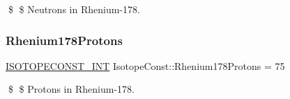 \$ \$ Neutrons in Rhenium-\/178. \mbox{\label{group___isotope_const-_rhenium-_re178_ga0aea92ba88e0dd415e1ff6c8df31ca54}} 
\subsubsection{\texorpdfstring{Rhenium178\+Protons}{Rhenium178Protons}}
{\footnotesize\ttfamily \mbox{\hyperlink{group___isotope_const-_macros_ga5f18360b3e99483a35c32d789e62621c}{I\+S\+O\+T\+O\+P\+E\+C\+O\+N\+S\+T\+\_\+\+I\+NT}} Isotope\+Const\+::\+Rhenium178\+Protons = 75}

\$ \$ Protons in Rhenium-\/178. 